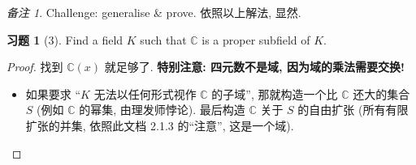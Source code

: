 \documentclass[11pt]{ctexart}
\theoremstyle{definition}
\numberwithin{equation}{section}
\theoremstyle{definition}
\newtheorem*{exercise}{习题}
\theoremstyle{remark}
\newtheorem*{remark}{备注}
\begin{document}
\begin{remark}
    Challenge: generalise \& prove. 依照以上解法, 显然. 
\end{remark}

\begin{exercise}[3]
    Find a field $K$ such that $\mathbb C$ is a proper subfield of $K$. 
    \begin{proof}
        找到 $\mathbb C(x)$ 就足够了. \textbf{特别注意: 四元数不是域, 因为域的乘法需要交换!}
        \begin{itemize}
            \item 如果要求 ``$K$ 无法以任何形式视作 $\mathbb C$ 的子域'', 那就构造一个比 $\mathbb C$ 还大的集合 $S$ (例如 $\mathbb C$ 的幂集, 由理发师悖论). 最后构造 $\mathbb C$ 关于 $S$ 的自由扩张 (所有有限扩张的并集, 依照此文档 2.1.3 的``注意'', 这是一个域). 
        \end{itemize}
         
    \end{proof}
\end{exercise}
\end{document}
